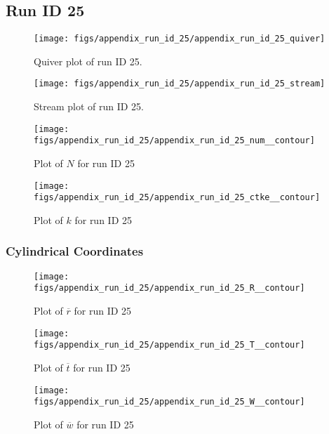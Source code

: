\subsection{Run ID 25}
\begin{figure}[H]
\centering
\texttt{[image: figs/appendix\_run\_id\_25/appendix\_run\_id\_25\_quiver]}
\caption{Quiver plot of run ID 25.}
\label{fig:appendix_run_id_25_quiver}
\end{figure}


\begin{figure}[H]
\centering
\texttt{[image: figs/appendix\_run\_id\_25/appendix\_run\_id\_25\_stream]}
\caption{Stream plot of run ID 25.}
\label{fig:appendix_run_id_25_stream}
\end{figure}


\begin{figure}[H]
\centering
\texttt{[image: figs/appendix\_run\_id\_25/appendix\_run\_id\_25\_num\_\_contour]}
\caption{Plot of $N$ for run ID 25}
\label{fig:appendix_run_id_25_num__contour}
\end{figure}


\begin{figure}[H]
\centering
\texttt{[image: figs/appendix\_run\_id\_25/appendix\_run\_id\_25\_ctke\_\_contour]}
\caption{Plot of $k$ for run ID 25}
\label{fig:appendix_run_id_25_ctke__contour}
\end{figure}


\subsubsection{Cylindrical Coordinates}
\begin{figure}[H]
\centering
\texttt{[image: figs/appendix\_run\_id\_25/appendix\_run\_id\_25\_R\_\_contour]}
\caption{Plot of $\overline{r}$ for run ID 25}
\label{fig:appendix_run_id_25_R__contour}
\end{figure}


\begin{figure}[H]
\centering
\texttt{[image: figs/appendix\_run\_id\_25/appendix\_run\_id\_25\_T\_\_contour]}
\caption{Plot of $\overline{t}$ for run ID 25}
\label{fig:appendix_run_id_25_T__contour}
\end{figure}


\begin{figure}[H]
\centering
\texttt{[image: figs/appendix\_run\_id\_25/appendix\_run\_id\_25\_W\_\_contour]}
\caption{Plot of $\overline{w}$ for run ID 25}
\label{fig:appendix_run_id_25_W__contour}
\end{figure}


